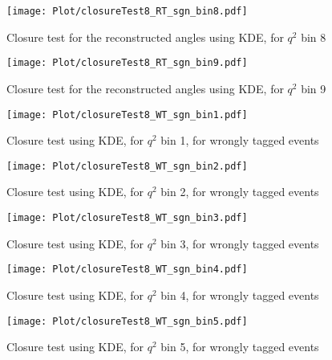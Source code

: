 \begin{figure}[hbt]
    \texttt{[image: Plot/closureTest8\_RT\_sgn\_bin8.pdf]}

    \caption{Closure test for the reconstructed angles using KDE, for $q^2$ bin 8}
    \label{fig:clKDE8}
\end{figure}

\begin{figure}[hbt]
    \texttt{[image: Plot/closureTest8\_RT\_sgn\_bin9.pdf]}

    \caption{Closure test for the reconstructed angles using KDE, for $q^2$ bin 9}
    \label{fig:clKDE9}
\end{figure}

\clearpage

\begin{figure}[hbt]
    \texttt{[image: Plot/closureTest8\_WT\_sgn\_bin1.pdf]}

    \caption{Closure test using KDE, for $q^2$ bin 1, for wrongly tagged events}
    \label{fig:clKDE1wt}
\end{figure}

\begin{figure}[hbt]
    \texttt{[image: Plot/closureTest8\_WT\_sgn\_bin2.pdf]}

    \caption{Closure test using KDE, for $q^2$ bin 2, for wrongly tagged events}
    \label{fig:clKDE2wt}
\end{figure}

\begin{figure}[hbt]
    \texttt{[image: Plot/closureTest8\_WT\_sgn\_bin3.pdf]}

    \caption{Closure test using KDE, for $q^2$ bin 3, for wrongly tagged events}
    \label{fig:clKDE3wt}
\end{figure}

\begin{figure}[hbt]
    \texttt{[image: Plot/closureTest8\_WT\_sgn\_bin4.pdf]}

    \caption{Closure test using KDE, for $q^2$ bin 4, for wrongly tagged events}
    \label{fig:clKDE4wt}
\end{figure}

\begin{figure}[hbt]
    \texttt{[image: Plot/closureTest8\_WT\_sgn\_bin5.pdf]}

    \caption{Closure test using KDE, for $q^2$ bin 5, for wrongly tagged events}
    \label{fig:clKDE5wt}
\end{figure}

